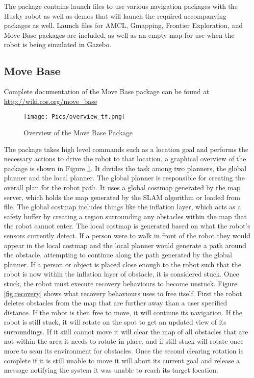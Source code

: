 The package contains launch files to use various navigation packages with the Husky robot as well as demos that will launch the required accompanying packages as well. Launch files for AMCL, Gmapping, Frontier Exploration, and Move Base packages are included, as well as an empty map for use when the robot is being simulated in Gazebo.\\ 

\subsection{Move Base}

Complete documentation of the Move Base package can be found at \url{http://wiki.ros.org/move_base}\\

\begin{figure}[H]
    \centering
    \texttt{[image: Pics/overview\_tf.png]}
    \caption{Overview of the Move Base Package \cite{rosmovebase}}
    \label{fig:movebaseoverview}
\end{figure}

The  package takes high level commands such as a location goal and performs the necessary actions to drive the robot to that location. a graphical overview of the package is shown in Figure \ref{fig:movebaseoverview}. It divides the task among two planners, the global planner and the local planner. The global planner is responsible for creating the overall plan for the robot path. It uses a global costmap generated by the map server, which holds the map generated by the SLAM algorithm or loaded from file. The global costmap includes things like the inflation layer, which acts as a safety buffer by creating a region surrounding any obstacles within the map that the robot cannot enter. The local costmap is generated based on what the robot's sensors currently detect. If a person were to walk in front of the robot they would appear in the local costmap and the local planner would generate a path around the obstacle, attempting to continue along the path generated by the global planner. If a person or object is placed close enough to the robot such that the robot is now within the inflation layer of obstacle, it is considered stuck. Once stuck, the robot must execute recovery behaviours to become unstuck. Figure \ref{fig:recovery} shows what recovery behaviours  uses to free itself. First the robot deletes obstacles from the map that are further away than a user specified distance. If the robot is then free to move, it will continue its navigation. If the robot is still stuck, it will rotate on the spot to get an updated view of its surroundings. If it still cannot move it will clear the map of all obstacles that are not within the area it needs to rotate in place, and if still stuck will rotate once more to scan its environment for obstacles. Once the second clearing rotation is complete if it is still unable to move it will abort its current goal and release a message notifying the system it was unable to reach its target location.\\

